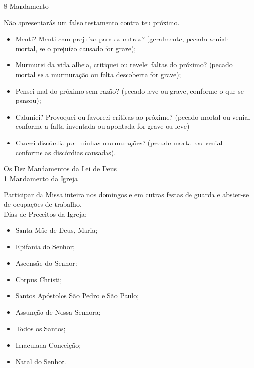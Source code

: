 \documentclass{book}
\begin{document}
\begin{center}
    8\textordmasculine{} Mandamento
\end{center}
\begin{flushleft}
    Não apresentarás um falso testamento contra teu próximo.
\end{flushleft}
\begin{itemize}
    \item Menti? Menti com prejuízo para os outros? (geralmente, pecado venial: mortal, se o prejuízo causado for grave);
    \item Murmurei da vida alheia, critiquei ou revelei faltas do próximo? (pecado mortal se a murmuração ou falta descoberta for grave);
    \item Pensei mal do próximo sem razão? (pecado leve ou grave, conforme o que se pensou);
    \item Caluniei? Provoquei ou favoreci críticas ao próximo? (pecado mortal ou venial conforme a falta inventada ou apontada for grave ou leve);
    \item Causei discórdia por minhas murmurações? (pecado mortal ou venial conforme as discórdias causadas).
\end{itemize}
\newpage
\begin{center}
    \textcolor{VioletRed2}{Os Dez Mandamentos da Lei de Deus} \\
    \hfill{} \break{}
    1\textordmasculine{} Mandamento da Igreja
\end{center}
\begin{flushleft}
    Participar da Missa inteira nos domingos e em outras festas de guarda e abster-se de ocupações de trabalho. \\
    \hfill{} \break{}
    Dias de Preceitos da Igreja:
    \begin{itemize}
        \item  Santa Mãe de Deus, Maria;
        \item Epifania do Senhor;
        \item Ascensão do Senhor;
        \item Corpus Christi;
        \item Santos Apóstolos São Pedro e São Paulo;
        \item Assunção de Nossa Senhora;
        \item Todos os Santos;
        \item Imaculada Conceição;
        \item Natal do Senhor.
    \end{itemize}
\end{flushleft}
\end{document}
